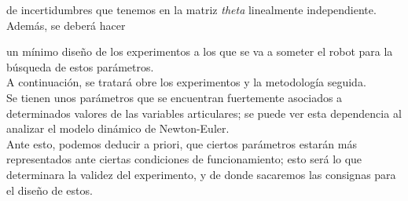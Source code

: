 de incertidumbres que tenemos en la matriz \textit{theta} linealmente independiente. Además, se deberá hacer

un mínimo diseño de los experimentos a los que se va a someter el robot para la búsqueda de estos parámetros.\\



A continuación, se tratará obre los experimentos y la metodología seguida.\\

Se tienen unos parámetros que se encuentran fuertemente asociados a determinados valores de las variables articulares; se puede ver esta dependencia al analizar el modelo dinámico de Newton-Euler.\\

Ante esto, podemos deducir a priori, que ciertos parámetros estarán más representados ante ciertas condiciones de funcionamiento; esto será lo que determinara la validez del experimento, y de donde sacaremos las consignas para el diseño de estos.\\



